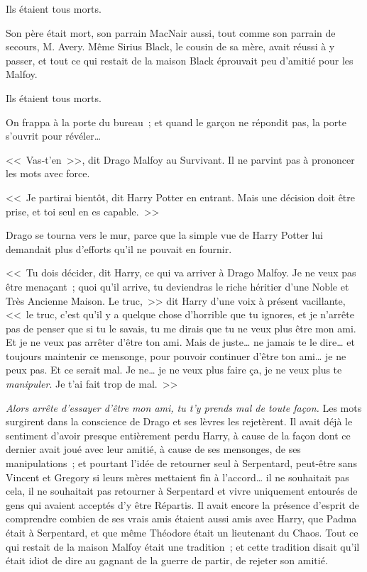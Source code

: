 Ils étaient tous morts.

Son père était mort, son parrain MacNair aussi, tout comme son parrain de secours, M. Avery. Même Sirius Black, le cousin de sa mère, avait réussi à y passer, et tout ce qui restait de la maison Black éprouvait peu d'amitié pour les Malfoy.

Ils étaient tous morts.

On frappa à la porte du bureau~; et quand le garçon ne répondit pas, la porte s'ouvrit pour révéler…

<<~Vas-t'en~>>, dit Drago Malfoy au Survivant. Il ne parvint pas à prononcer les mots avec force.

<<~Je partirai bientôt, dit Harry Potter en entrant. Mais une décision doit être prise, et toi seul en es capable.~>>

Drago se tourna vers le mur, parce que la simple vue de Harry Potter lui demandait plus d'efforts qu'il ne pouvait en fournir.

<<~Tu dois décider, dit Harry, ce qui va arriver à Drago Malfoy. Je ne veux pas être menaçant~; quoi qu'il arrive, tu deviendras le riche héritier d'une Noble et Très Ancienne Maison. Le truc,~>> dit Harry d'une voix à présent vacillante, <<~le truc, c'est qu'il y a quelque chose d'horrible que tu ignores, et je n'arrête pas de penser que si tu le savais, tu me dirais que tu ne veux plus être mon ami. Et je ne veux pas arrêter d'être ton ami. Mais de juste… ne jamais te le dire… et toujours maintenir ce mensonge, pour pouvoir continuer d'être ton ami… je ne peux pas. Et ce serait mal. Je ne… je ne veux plus faire ça, je ne veux plus te \emph{manipuler}. Je t'ai fait trop de mal.~>>

\emph{Alors arrête d'essayer d'être mon ami, tu t'y prends mal de toute façon.} Les mots surgirent dans la conscience de Drago et ses lèvres les rejetèrent. Il avait déjà le sentiment d'avoir presque entièrement perdu Harry, à cause de la façon dont ce dernier avait joué avec leur amitié, à cause de ses mensonges, de ses manipulations~; et pourtant l'idée de retourner seul à Serpentard, peut-être sans Vincent et Gregory si leurs mères mettaient fin à l'accord… il ne souhaitait pas cela, il ne souhaitait pas retourner à Serpentard et vivre uniquement entourés de gens qui avaient acceptés d'y être Répartis. Il avait encore la présence d'esprit de comprendre combien de ses vrais amis étaient aussi amis avec Harry, que Padma était à Serpentard, et que même Théodore était un lieutenant du Chaos. Tout ce qui restait de la maison Malfoy était une tradition~; et cette tradition disait qu'il était idiot de dire au gagnant de la guerre de partir, de rejeter son amitié.

